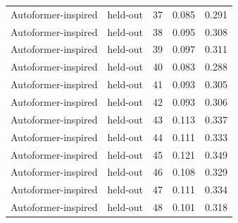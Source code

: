 \begin{tabular}{llrrr}
Autoformer-inspired & held-out & 37 & 0.085 & 0.291 \\
Autoformer-inspired & held-out & 38 & 0.095 & 0.308 \\
Autoformer-inspired & held-out & 39 & 0.097 & 0.311 \\
Autoformer-inspired & held-out & 40 & 0.083 & 0.288 \\
Autoformer-inspired & held-out & 41 & 0.093 & 0.305 \\
Autoformer-inspired & held-out & 42 & 0.093 & 0.306 \\
Autoformer-inspired & held-out & 43 & 0.113 & 0.337 \\
Autoformer-inspired & held-out & 44 & 0.111 & 0.333 \\
Autoformer-inspired & held-out & 45 & 0.121 & 0.349 \\
Autoformer-inspired & held-out & 46 & 0.108 & 0.329 \\
Autoformer-inspired & held-out & 47 & 0.111 & 0.334 \\
Autoformer-inspired & held-out & 48 & 0.101 & 0.318 \\
\bottomrule
\end{tabular}
